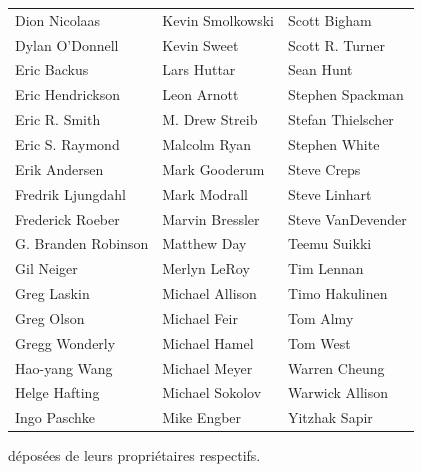 \documentclass[titlepage]{article}
\begin{document}
\begin{longtable}{lll}
Dion Nicolaas & Kevin Smolkowski & Scott Bigham\\
Dylan O'Donnell & Kevin Sweet & Scott R. Turner\\
Eric Backus & Lars Huttar & Sean Hunt\\
Eric Hendrickson & Leon Arnott & Stephen Spackman\\
Eric R. Smith & M. Drew Streib & Stefan Thielscher\\
Eric S. Raymond & Malcolm Ryan & Stephen White\\
Erik Andersen & Mark Gooderum & Steve Creps\\
Fredrik Ljungdahl & Mark Modrall & Steve Linhart\\
Frederick Roeber & Marvin Bressler & Steve VanDevender\\
G. Branden Robinson & Matthew Day & Teemu Suikki\\
Gil Neiger & Merlyn LeRoy & Tim Lennan\\
Greg Laskin & Michael Allison & Timo Hakulinen\\
Greg Olson & Michael Feir & Tom Almy\\
Gregg Wonderly & Michael Hamel & Tom West\\
Hao-yang Wang & Michael Meyer & Warren Cheung\\
Helge Hafting & Michael Sokolov & Warwick Allison\\
Ingo Paschke & Mike Engber & Yitzhak Sapir\\
\end{longtable}
\medskip


déposées de leurs propriétaires respectifs.\textquotedbl{}
\end{document}
